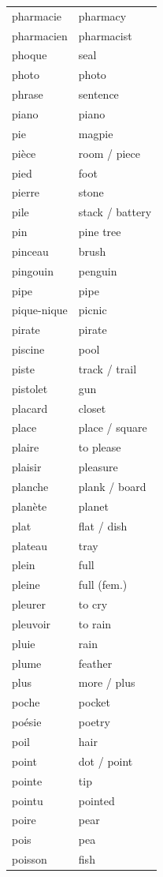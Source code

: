 \documentclass[12pt,a4paper]{article}
\begin{document}
\begin{longtable}{p{4cm} p{6cm}}
pharmacie & pharmacy \\
pharmacien & pharmacist \\
phoque & seal \\
photo & photo \\
phrase & sentence \\
piano & piano \\
pie & magpie \\
pièce & room / piece \\
pied & foot \\
pierre & stone \\
pile & stack / battery \\
pin & pine tree \\
pinceau & brush \\
pingouin & penguin \\
pipe & pipe \\
pique-nique & picnic \\
pirate & pirate \\
piscine & pool \\
piste & track / trail \\
pistolet & gun \\
placard & closet \\
place & place / square \\
plaire & to please \\
plaisir & pleasure \\
planche & plank / board \\
planète & planet \\
plat & flat / dish \\
plateau & tray \\
plein & full \\
pleine & full (fem.) \\
pleurer & to cry \\
pleuvoir & to rain \\
pluie & rain \\
plume & feather \\
plus & more / plus \\
poche & pocket \\
poésie & poetry \\
poil & hair \\
point & dot / point \\
pointe & tip \\
pointu & pointed \\
poire & pear \\
pois & pea \\
poisson & fish \\

\end{longtable}
\end{document}
